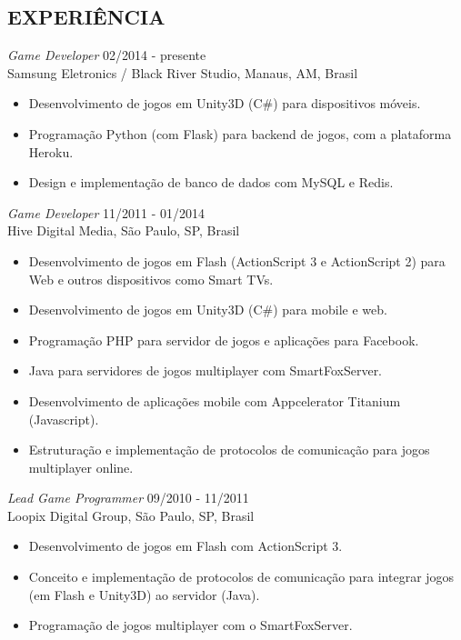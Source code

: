 \documentclass[line,margin]{res}
\begin{document}
\begin{resume}
\section{EXPERIÊNCIA} {\sl Game Developer} \hfill 02/2014 - presente \\
                Samsung Eletronics / Black River Studio, Manaus, AM, Brasil
                 \begin{itemize}  \itemsep 1pt
                 \item Desenvolvimento de jogos em Unity3D (C\#) para dispositivos móveis.
		 \item Programação Python (com Flask) para backend de jogos, com a plataforma Heroku.
                 \item Design e implementação de banco de dados com MySQL e Redis.
                 \end{itemize}

		{\sl Game Developer} \hfill 11/2011 - 01/2014 \\
                Hive Digital Media, São Paulo, SP, Brasil
                 \begin{itemize}  \itemsep 1pt
                 \item Desenvolvimento de jogos em Flash (ActionScript 3 e ActionScript 2) para Web e outros dispositivos como Smart TVs.
		 \item Desenvolvimento de jogos em Unity3D (C\#) para mobile e web.
                 \item Programação PHP para servidor de jogos e aplicações para Facebook.
                 \item Java para servidores de jogos multiplayer com SmartFoxServer.
		 \item Desenvolvimento de aplicações mobile com Appcelerator Titanium (Javascript).
                 \item Estruturação e implementação de protocolos de comunicação para jogos multiplayer online.
                 \end{itemize}
                 
                 {\sl Lead Game Programmer} \hfill 09/2010 - 11/2011 \\
                Loopix Digital Group, São Paulo, SP, Brasil
                 \begin{itemize}  \itemsep 1pt
                 \item Desenvolvimento de jogos em Flash com ActionScript 3.
                 \item Conceito e implementação de protocolos de comunicação para integrar jogos (em Flash e Unity3D) ao servidor (Java).
                 \item Programação de jogos multiplayer com o SmartFoxServer.
                 \end{itemize}
 

\end{resume}
\end{document}
